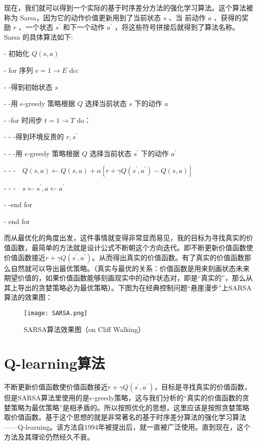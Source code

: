现在，我们就可以得到一个实际的基于时序差分方法的强化学习算法。这个算法被称为 Sarsa，因为它的动作价值更新用到了当前状态 $s$ 、当 前动作 $a$ 、获得的奖励 $r$ 、一个状态 $s^{\prime}$ 和下一个动作 $a^{\prime}$ ，将这些符号拼接后就得到了算法名称。Sarsa 的具体算法如下:

- 初始化 $Q(s, a)$

- for 序列 $e=1 \rightarrow E$ do:

- -得到初始状态 $s$

- -用 $\epsilon$-greedy 策略根据 $Q$ 选择当前状态 $s$ 下的动作 $a$

- -for 时间步 $t=1 \rightarrow T$ do：

- - -得到环境反贵的 $r, s^{\prime}$

- - -用 $\epsilon$-greedy 策略根据 $Q$ 选择当前状态 $s^{\prime}$ 下的动作 $a^{\prime}$

- - -$\quad Q(s, a) \leftarrow Q(s, a)+\alpha\left[r+\gamma Q\left(s^{\prime}, a^{\prime}\right)-Q(s, a)\right]$

- - -$\quad s \leftarrow s^{\prime}, a \leftarrow a^{\prime}$

- -end for

- end for

而从最优化的角度出发，这件事情就变得非常显而易见，我的目标为寻找真实的价值函数，最简单的方法就是设计公式不断朝这个方向迭代。即不断更新价值函数使价值函数接近$r+\gamma Q\left(s^{\prime}, a^{\prime}\right)$。从而得出真实的价值函数。有了真实的价值函数那么自然就可以导出最优策略。（真实与最优的关系：价值函数是用来刻画状态未来期望价值的，如果价值函数能够刻画现实中的动作状态对，即是“真实的”，那么从其上导出的贪婪策略必为最优策略）。下图为在经典控制问题“悬崖漫步”上SARSA算法的效果图：
\begin{figure}[hbt]
    \centering
    \texttt{[image: SARSA.png]}
	\vspace{-0.5cm}
    \caption{SARSA算法效果图（on Cliff Walking）}
    \label{SARSA}
\end{figure}

\section{Q-learning算法}
不断更新价值函数使价值函数接近$r+\gamma Q\left(s^{\prime}, a^{\prime}\right)$，目标是寻找真实的价值函数，但是SARSA算法里使用的是$\epsilon$-greedy策略，这与我们分析的“真实的价值函数的贪婪策略为最优策略”是相矛盾的。所以按照优化的思想，这里应该是按照贪婪策略取价值函数。基于这个思想的就是非常著名的基于时序差分算法的强化学习算法——Q-learning。该方法自1994年被提出\cite{rummery1994line}后，就一直被广泛使用。直到现在，这个方法及其理论仍然经久不衰。


